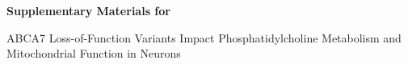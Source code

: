 \begin{titlepage}
    \centering
    {\Large \bfseries Supplementary Materials for\par}
    \vspace{1em}
    {\large ABCA7 Loss-of-Function Variants Impact Phosphatidylcholine Metabolism and Mitochondrial Function in Neurons\par}
    \vfill
\end{titlepage}
